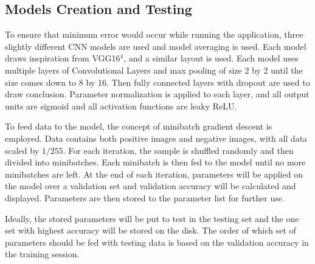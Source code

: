 \documentclass[twocolumn, 12pt]{article}
\begin{document}
\subsection{Models Creation and Testing}
To ensure that minimum error would occur while running the application, three slightly different CNN models are used and model averaging is used. Each model draws inspiration from VGG16$^4$, and a similar layout is used. Each model uses multiple layers of Convolutional Layers and max pooling of size 2 by 2 until the size comes down to 8 by 16. Then fully connected layers with dropout are used to draw conclusion. Parameter normalization is applied to each layer, and all output units are sigmoid and all activation functions are leaky ReLU. 

To feed data to the model, the concept of minibatch gradient descent is employed. Data contains both positive images and negative images, with all data scaled by $1/255$. For each iteration, the sample is shuffled randomly and then divided into minibatches. Each minibatch is then fed to the model until no more minibatches are left. At the end of each iteration, parameters will be applied on the model over a validation set and validation accuracy will be calculated and displayed. Parameters are then stored to the parameter list for further use. 

Ideally, the stored parameters will be put to test in the testing set and the one set with highest accuracy will be stored on the disk. The order of which set of parameters should be fed with testing data is based on the validation accuracy in the training session.
\end{document}
